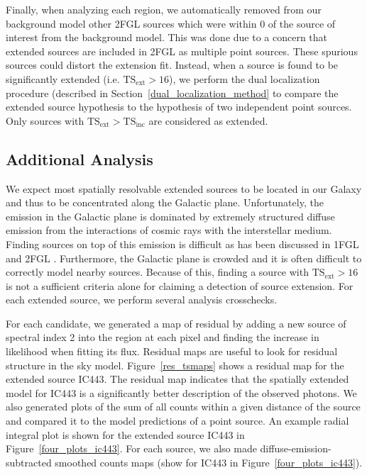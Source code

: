 \documentclass[12pt,preprint]{aastex}
\newcommand{\gev}{\text{GeV}\xspace}
\newcommand{\tsext}{{\ensuremath{\text{TS}_{\text{ext}}}}\xspace}
\newcommand{\tsinc}{\ensuremath{\text{TS}_{\text{inc}}}\xspace}
\newcommand{\ts}{\text{TS}\xspace}
\begin{document}
Finally, when analyzing each region, we automatically removed from
our background model other 2FGL sources which were within 0 of
the source of interest from the background model. This was done due
to a concern that extended sources are included in 2FGL as multiple
point sources. These spurious sources could distort the extension
fit.  Instead, when a source is found to be significantly extended
(i.e. $\tsext>16$), we perform the dual localization procedure (described
in Section~\ref{dual_localization_method} to compare the extended source
hypothesis to the hypothesis of two independent point sources. Only
sources with $\tsext>\tsinc$ are considered as extended.

\subsection{Additional Analysis}

We expect most spatially resolvable extended sources to be located
in our Galaxy and thus to be concentrated along the Galactic plane.
Unfortunately, the \gev emission in the Galactic plane is dominated by
extremely structured diffuse emission from the interactions of cosmic rays
with the interstellar medium.  Finding sources on top of this emission
is difficult \citep{first_diffuse_paper} as has been discussed in 1FGL
and 2FGL \citep{first_cat,second_cat}.  Furthermore, the Galactic plane
is crowded and it is often difficult to correctly model nearby sources.
Because of this, finding a source with $\tsext>16$ is not a sufficient
criteria alone for claiming a detection of source extension.  For each
extended source, we perform several analysis crosschecks.

For each candidate, we generated a map of residual \ts by adding a new
source of spectral index 2 into the region at each pixel and finding the
increase in likelihood when fitting its flux. Residual \ts maps are useful
to look for residual structure in the sky model.  Figure~\ref{res_tsmaps}
shows a residual \ts map for the extended source IC443.  The residual
\ts map indicates that the spatially extended model for IC443 is a
significantly better description of the observed photons.  We also
generated plots of the sum of all counts within a given distance of
the source and compared it to the model predictions of a point source.
An example radial integral plot is shown for the extended source
IC443 in Figure~\ref{four_plots_ic443}.  For each source, we also made
diffuse-emission-subtracted smoothed counts maps (show for IC443 in
Figure~\ref{four_plots_ic443}).
\end{document}
